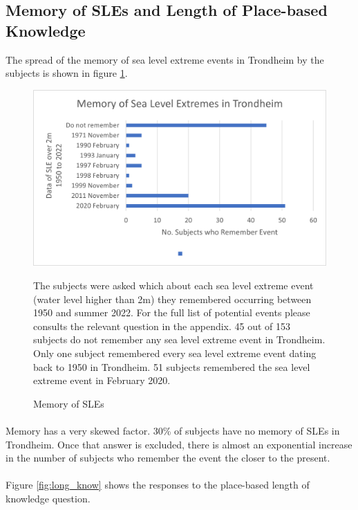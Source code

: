 \subsection{Memory of SLEs and Length of Place-based Knowledge}
The spread of the memory of sea level extreme events in Trondheim by the subjects is shown in figure \ref{fig:memory_sle}.

\begin{figure}[H]
    \centering
    \includegraphics{fig_results/memory-sle.png}
    \caption{Memory of SLEs}{ The subjects were asked which about each sea level extreme event (water level higher than 2m) they remembered occurring between 1950 and summer 2022. For the full list of potential events please consults the relevant question in the appendix. 45 out of 153 subjects do not remember any sea level extreme event in Trondheim. Only one subject remembered every sea level extreme event dating back to 1950 in Trondheim. 51 subjects remembered the sea level extreme event in February 2020. }
    \label{fig:memory_sle}
\end{figure}
\paragraph{}

Memory has a very skewed factor. 30\% of subjects have no memory of SLEs in Trondheim. Once that answer is excluded, there is almost an exponential increase in the number of subjects who remember the event the closer to the present. 
\paragraph{}
Figure \ref{fig:long_know} shows the responses to the place-based length of knowledge question.

